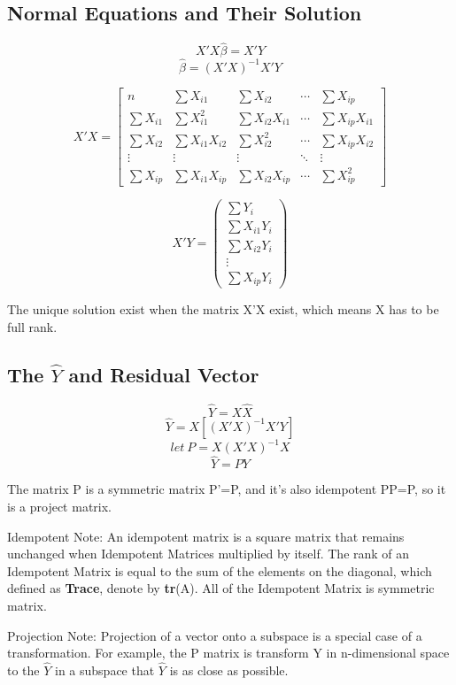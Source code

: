 \documentclass[12pt]{article}
\begin{document}
\subsection{Normal Equations and Their Solution}

$$X'X\hat{\beta} = X'Y$$
$$\hat{\beta} = (X'X)^{-1} X'Y$$

\[
X'X =
\begin{bmatrix}
n  &\sum X_{i1}  &\sum X_{i2}  &\cdots   &\sum X_{ip} \\ 
\sum X_{i1} &\sum X_{i1}^2 &\sum X_{i2} X_{i1}  &\cdots   &\sum X_{ip} X_{i1}  \\ 
\sum X_{i2} &\sum X_{i1}X_{i2} &\sum X_{i2}^2  &\cdots   &\sum X_{ip} X_{i2} \\ 
\vdots &\vdots  &\vdots  &\ddots  &\vdots \\ 
\sum X_{ip} &\sum X_{i1} X_{ip} &\sum  X_{i2} X_{ip} &\cdots  &\sum X_{ip}^2
\end{bmatrix}
\]

$$
X'Y = 
\begin{pmatrix}
\sum Y_i \\ 
\sum X_{i1}Y_i \\
\sum X_{i2}Y_i \\
\vdots  \\  
\sum X_{ip}Y_i
\end{pmatrix}
$$

The unique solution exist when the matrix X'X exist, which means X has to be full rank.


\subsection{The $\hat{Y}$ and Residual Vector}

$$\hat{Y} = X\hat{X}$$
$$\hat{Y} = X[(X'X)^{-1}X'Y]$$
$$let \ P = X(X'X)^{-1}X$$
$$\hat{Y} = PY $$

The matrix P is a symmetric matrix P'=P, and it's also idempotent PP=P, so it is a project matrix.

Idempotent Note: An idempotent matrix is a square matrix that remains unchanged when Idempotent Matrices multiplied by itself.
The rank of an Idempotent Matrix is equal to the sum of the
elements on the diagonal, which defined as \textbf{Trace}, denote by \textbf{tr}(A).
All of the Idempotent Matrix is symmetric matrix.

Projection Note: Projection of a vector onto a subspace is a special case of a transformation. For example, the P matrix is transform Y in n-dimensional space to the $\hat{Y}$ in a subspace that $\hat{Y}$ is as close as possible. 
\end{document}
